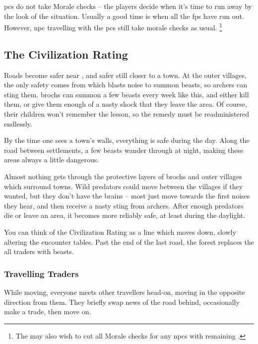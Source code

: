\begin{multicols}{2}
\Glspl{pc} do not take Morale checks -- the players decide when it's time to run away by the look of the situation.
Usually a good time is when all the \glspl{fp} have run out.
%
However, \gls{npc} travelling with the \glspl{pc} still take morale checks as usual.%
\footnote{The  may also wish to cut all Morale checks for any \glspl{npc} with remaining .}%


\subsection{The Civilization Rating}
\label{civilizationRating}

Roads become safer near , and safer still closer to a town.
At the outer \glspl{village}, the only safety comes from  which blasts noise to summon beasts, so archers can sting them.
\Glspl{broch} can summon a few beasts every week like this, and either kill them, or give them enough of a nasty shock that they leave the area.
Of course, their children won't remember the lesson, so the remedy must be readministered endlessly.

By the time one sees a town's walls, everything is safe during the day.
Along the road between settlements, a few beasts wander through at night, making these areas always a little dangerous.

Almost nothing gets through the protective layers of \glspl{broch} and outer \glspl{village} which surround towns.
Wild predators could move between the \glspl{village} if they wanted, but they don't have the brains -- most just move towards the first noises they hear, and then receive a nasty sting from archers.
After enough predators die or leave an area, it becomes more reliably safe, at least during the daylight.

You can think of the Civilization Rating as a line which moves down, slowly altering the encounter tables.
Past the end of the last road, the forest replaces the all traders with beasts.

\subsubsection{Travelling Traders}
\label{traders}

While moving, everyone meets other travellers head-on, moving in the opposite direction from them.
They briefly swap news of the road behind, occasionally make a trade, then move on.


\end{multicols}
